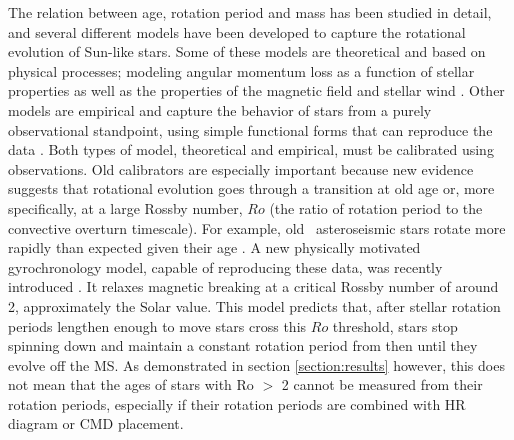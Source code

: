The relation between age, rotation period and mass has been studied in detail,
and several different models have been developed to capture the rotational
evolution of Sun-like stars.
Some of these models are theoretical and based on physical processes; modeling
angular momentum loss as a function of stellar properties as well as the
properties of the magnetic field and stellar wind \citep{kawaler1988,
kawaler1989, vansaders2013, matt2015, vansaders2016}.
Other models are empirical and capture the behavior of stars from a purely
observational standpoint, using simple functional forms that can reproduce the
data \citep{barnes2003, barnes2007, mamajek2008, angus2015}.
Both types of model, theoretical and empirical, must be calibrated using
observations.
Old calibrators are especially important because new evidence suggests that
rotational evolution goes through a transition at old age or, more
specifically, at a large Rossby number, $Ro$ (the ratio of rotation period to
the convective overturn timescale).
For example, old \kepler\ asteroseismic stars rotate more rapidly than
expected given their age \citep{angus2015, vansaders2016}.
A new physically motivated gyrochronology model, capable of reproducing these
data, was recently introduced \citep{vansaders2016}.
It relaxes magnetic breaking at a critical Rossby number of around 2,
approximately the Solar value.
This model predicts that, after stellar rotation periods lengthen enough to
move stars cross this $Ro$ threshold, stars stop spinning down and maintain a
constant rotation period from then until they evolve off the MS.
As demonstrated in section \ref{section:results} however, this does not mean
that the ages of stars with Ro $>$ 2 cannot be measured from their rotation
periods, especially if their rotation periods are combined with HR diagram or
CMD placement.

